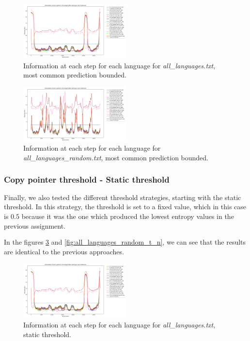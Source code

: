 \documentclass{article}
\begin{document}
\begin{figure}
    \centering
    \includegraphics[width=0.5\textwidth]{../results/all_languages/-r_c:100.png}
    \caption{Information at each step for each language for \textit{all\_languages.txt}, most common prediction bounded.}
    \label{fig:all_languages_r_c}
\end{figure}

\begin{figure}
    \centering
    \includegraphics[width=0.5\textwidth]{../results/all_languages_random/-r_c:100.png}
    \caption{Information at each step for each language for \textit{all\_languages\_random.txt}, most common prediction bounded.}
    \label{fig:all_languages_random_r_c}
\end{figure}

\subsubsection{Copy pointer threshold - Static threshold}
\label{subsubsec:results_locate_lang_static_threshold}

Finally, we also tested the different threshold strategies, starting with the static threshold.
In this strategy, the threshold is set to a fixed value, which in this case is $0.5$ because it was the one which produced the lowest entropy values in the previous assignment.

In the figures \ref{fig:all_languages_t_n} and \ref{fig:all_languages_random_t_n}, we can see that the results are identical to the previous approaches.

\begin{figure}
    \centering
    \includegraphics[width=0.5\textwidth]{../results/all_languages/-t_n:0.5.png}
    \caption{Information at each step for each language for \textit{all\_languages.txt}, static threshold.}
    \label{fig:all_languages_t_n}
\end{figure}
\end{document}
